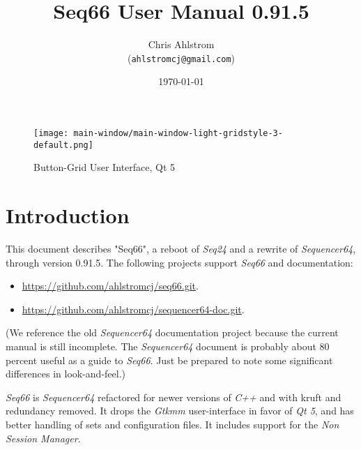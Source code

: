 \documentclass[
 11pt,
 twoside,
 a4paper,
 headinclude,
 footinclude,
 final                                 %
]{article}
\begin{document}
\title{Seq66 User Manual 0.91.5}
\author{Chris Ahlstrom \\
   (\texttt{ahlstromcj@gmail.com})}
\date{\today}
\maketitle

\begin{figure}[H]
   \centering 
   \texttt{[image: main-window/main-window-light-gridstyle-3-default.png]}
   \caption*{Button-Grid User Interface, Qt 5}
\end{figure}

\clearpage                             %

\tableofcontents
\listoffigures                         %
\listoftables                          %


\setlength{\parindent}{2em}
\setlength{\parskip}{1ex plus 0.5ex minus 0.2ex}
\rhead{\rightmark}         %

\section{Introduction}
\label{sec:introduction}

   This document describes "Seq66", a reboot of \textsl{Seq24} and a rewrite of
   \textsl{Sequencer64}, through version 0.91.5.
   The following projects support \textsl{Seq66} and documentation:

   \begin{itemize}
      \item \url{https://github.com/ahlstromcj/seq66.git}.
      \item \url{https://github.com/ahlstromcj/sequencer64-doc.git}.
   \end{itemize}

   (We reference the old \textsl{Sequencer64} documentation project because
   the current manual is still incomplete.  The \textsl{Sequencer64}
   document is probably about 80 percent useful as a guide to \textsl{Seq66}.
   Just be prepared to note some significant differences in look-and-feel.)

   \textsl{Seq66} is \textsl{Sequencer64} refactored for newer versions of
   \textsl{C++} and with kruft and redundancy removed.  It drops the
   \textsl{Gtkmm} user-interface in favor of \textsl{Qt 5},
   and has better handling of sets and configuration files.
   It includes support for the \textsl{Non Session Manager}.
\end{document}
